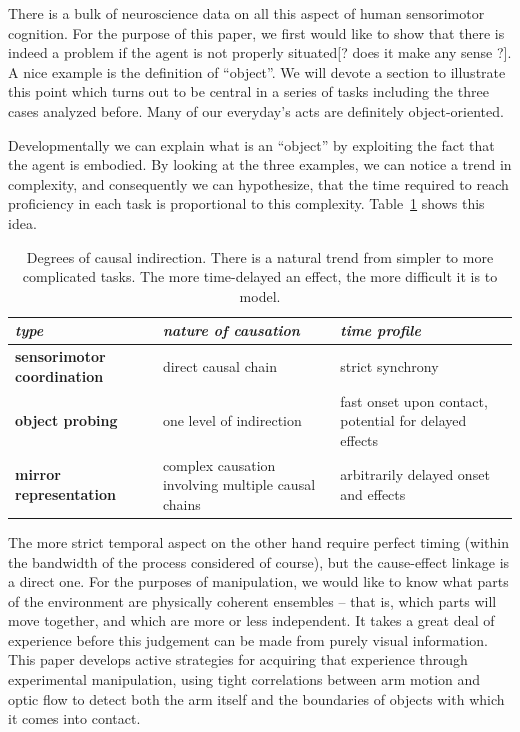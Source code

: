 \ifverbose
There is a bulk of neuroscience data on all this aspect of human
sensorimotor cognition. For the purpose of this paper, we first would
like to show that there is indeed a problem if the agent is not
properly situated[? does it make any sense ?]. A nice example is the
definition of ``object''.  We will devote a
section to illustrate this point which turns out to be central in a
series of tasks including the three cases analyzed before. Many of our everyday's
acts are definitely object-oriented.

Developmentally we can explain what is an ``object'' by exploiting
the fact that the agent is embodied.
By looking at the three examples, we can notice a trend in complexity, 
and consequently we can hypothesize, that the time required to reach proficiency 
in each task is proportional to this complexity. Table~\ref{tab:causation} shows this idea.
\fi

\begin{table}[htbp]
\begin{center}
\begin{tabular}{|p{3.5cm}|p{3.5cm}|p{3.5cm}|}
\hline
{\it type} & {\it nature of causation} &  {\it time profile} \\ \hline\hline
{\bf sensorimotor coordination} & direct causal chain & strict synchrony \\ \hline
{\bf object probing} & one level of indirection & fast onset upon contact, potential for delayed effects\\ \hline
{\bf mirror representation} &  complex causation involving multiple causal chains & arbitrarily delayed onset and effects\\ \hline
\end{tabular}
\caption{
\label{tab:causation}
%
Degrees of causal indirection. There is a natural
trend from simpler to more complicated tasks.  The more time-delayed
an effect, the more difficult it is to model.
%
}
\end{center}
\end{table}



\ifverbose
The more strict
temporal aspect on the other hand require perfect timing (within the
bandwidth of the process considered of course), but the cause-effect
linkage is a direct one.
For the purposes of manipulation, we would like to know what parts of
the environment are physically coherent ensembles -- that is, which
parts will move together, and which are more or less independent.  It
takes a great deal of experience before this judgement can be made
from purely visual information.  This paper develops active strategies
for acquiring that experience through experimental manipulation, using
tight correlations between arm motion and optic flow to detect both
the arm itself and the boundaries of objects with which it comes into
contact.
\fi

